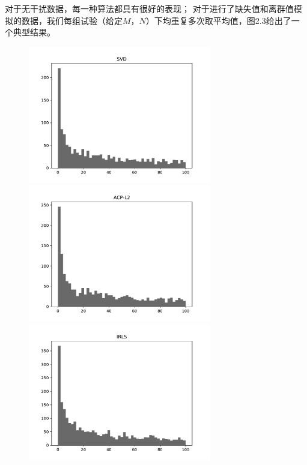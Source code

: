 对于无干扰数据，每一种算法都具有很好的表现；
对于进行了缺失值和离群值模拟的数据，我们每组试验（给定$M$，$ N$）下均重复多次取平均值，图2.3给出了一个典型结果。
\begin{figure}[H]
    \centering
    \begin{minipage}[t]{0.48\textwidth}
    \includegraphics[width=8cm]{pics/lab1/svd.pdf}
    \end{minipage}
    \begin{minipage}[t]{0.48\textwidth}
    \includegraphics[width=8cm]{pics/lab1/acp-l2.pdf}
    \end{minipage}
    \begin{minipage}[t]{0.48\textwidth}
    \includegraphics[width=8cm]{pics/lab1/IRLS.pdf}
    \end{minipage}
    \begin{minipage}[t]{0.48\textwidth}

\end{minipage}
\end{figure}
